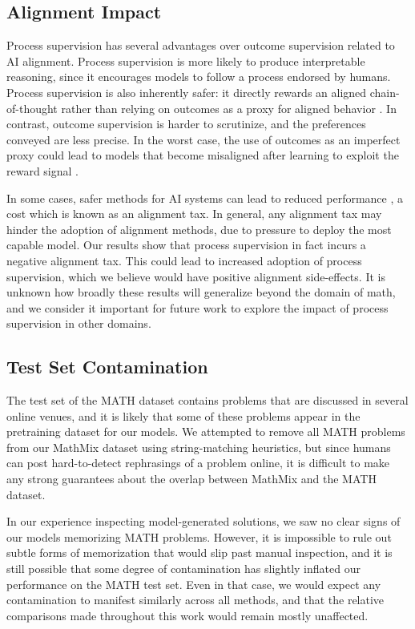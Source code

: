 \documentclass{article}
\begin{document}
\subsection{Alignment Impact}

Process supervision has several advantages over outcome supervision related to AI alignment. Process supervision is more likely to produce interpretable reasoning, since it encourages models to follow a process endorsed by humans. Process supervision is also inherently safer: it directly rewards an aligned chain-of-thought rather than relying on outcomes as a proxy for aligned behavior \citep{ought2022}. In contrast, outcome supervision is harder to scrutinize, and the preferences conveyed are less precise. In the worst case, the use of outcomes as an imperfect proxy could lead to models that become misaligned after learning to exploit the reward signal \citep{uesato2022solving, cotra2022, everitt2017reinforcement}. 

In some cases, safer methods for AI systems can lead to reduced performance \citep{ouyang2022training, askell2021general}, a cost which is known as an alignment tax. In general, any alignment tax may hinder the adoption of alignment methods, due to pressure to deploy the most capable model. Our results show that process supervision in fact incurs a negative alignment tax. This could lead to increased adoption of process supervision, which we believe would have positive alignment side-effects. It is unknown how broadly these results will generalize beyond the domain of math, and we consider it important for future work to explore the impact of process supervision in other domains.

\subsection{Test Set Contamination} \label{section:contamination}

The test set of the MATH dataset contains problems that are discussed in several online venues, and it is likely that some of these problems appear in the pretraining dataset for our models. We attempted to remove all MATH problems from our MathMix dataset using string-matching heuristics, but since humans can post hard-to-detect rephrasings of a problem online, it is difficult to make any strong guarantees about the overlap between MathMix and the MATH dataset.

In our experience inspecting model-generated solutions, we saw no clear signs of our models memorizing MATH problems. However, it is impossible to rule out subtle forms of memorization that would slip past manual inspection, and it is still possible that some degree of contamination has slightly inflated our performance on the MATH test set. Even in that case, we would expect any contamination to manifest similarly across all methods, and that the relative comparisons made throughout this work would remain mostly unaffected.
\end{document}
